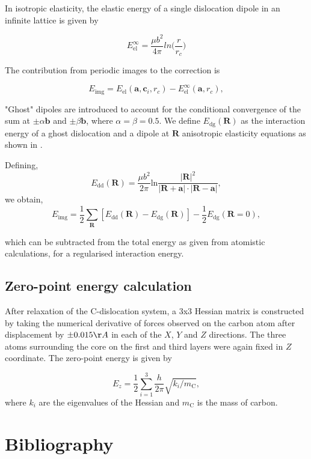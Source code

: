 \documentclass[a4paper,11pt]{article}
\begin{document}
In isotropic elasticity, the elastic energy of a single dislocation dipole in an
infinite lattice is given by


\[ E_{\text{el}}^{\infty} = \frac{\mu b^2}{4\pi} ln \big( \frac{r}{r_{c}} \big)  \]

The contribution from periodic images to the correction is 

\[ E_{\text{img} } = E_{\text{el}} (\mathbf{a}, \mathbf{c}_i , r_c) - E_{\text{el}}^{\infty}
   (\mathbf{a}, r_c),\]

"Ghost" dipoles are introduced to account for the conditional convergence of the sum at \(\pm\alpha
   \mathbf{b}\) and \(\pm \beta\mathbf{b}\), where \(\alpha = \beta = 0.5\). We define \(E_{\text{dg}} (\mathbf{R})\) as the
interaction energy of a ghost dislocation and a dipole at \(\mathbf{R}\) anisotropic elasticity
equations as shown in \cite{Cai2003}.


Defining, 
 \[ E_{\text{dd}} (\mathbf{R}) = \frac{\mu b^2}{2\pi}
   \text{ln}\frac{|\mathbf{R}|^2}{|\mathbf{R}+\mathbf{a}|\cdot|\mathbf{R}-\mathbf{a}|},
   \]
we obtain,
\[ E_{\text{img}} = \frac{1}{2}\sum_{\mathbf{R}} [ E_{\text{dd}} (\mathbf{R}) - E_{\text{dg}} (\mathbf{R}) ] - \frac{1}{2}
   E_{\text{dg}} (\mathbf{R} = 0),  \]

which can be subtracted from the total energy as given from atomistic calculations, for a
regularised interaction energy. 


\subsection{Zero-point energy calculation}
\label{sec:orgef25b9a}
\label{sec:zeropointenergy}

After relaxation of the C-dislocation system, a 3x3 Hessian matrix is constructed by taking the
numerical derivative of forces observed on the carbon atom after displacement by \(\pm 0.015 \AA\) in
each of the \(X\), \(Y\) and \(Z\) directions.  The three atoms surrounding the core on the first and
third layers were again fixed in \(Z\) coordinate. The zero-point energy is given by

\[ E_z = \frac{1}{2} \sum_{i=1}^3 \frac{h}{2\pi} \sqrt{ k_i /
   m_{\text{C}} },  \]
where \(k_i\) are the eigenvalues of the Hessian and \(m_\text{C}\) is
the mass of carbon. 


\section{Bibliography}
\label{sec:org832bd37}
\label{org72f4160}




\end{document}
